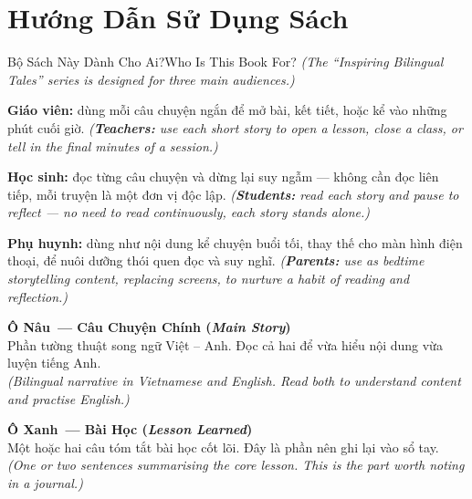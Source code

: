 \chapter*{Hướng Dẫn Sử Dụng Sách}

\begin{truyen}{Bộ Sách Này Dành Cho Ai?}{Who Is This Book For?}
\textit{(The ``Inspiring Bilingual Tales'' series is designed for three main audiences.)}

\textbf{Giáo viên:} dùng mỗi câu chuyện ngắn để mở bài, kết tiết, hoặc kể vào những phút cuối giờ.
\textit{(\textbf{Teachers:} use each short story to open a lesson, close a class, or tell in the final minutes of a session.)}

\textbf{Học sinh:} đọc từng câu chuyện và dừng lại suy ngẫm --- không cần đọc liên tiếp, mỗi truyện là một đơn vị độc lập.
\textit{(\textbf{Students:} read each story and pause to reflect --- no need to read continuously, each story stands alone.)}

\textbf{Phụ huynh:} dùng như nội dung kể chuyện buổi tối, thay thế cho màn hình điện thoại, để nuôi dưỡng thói quen đọc và suy nghĩ.
\textit{(\textbf{Parents:} use as bedtime storytelling content, replacing screens, to nurture a habit of reading and reflection.)}
\end{truyen}

\vspace{6pt}

\begin{tcolorbox}[
  colback=truyengold!8,
  colframe=truyengold!70!black,
  coltitle=black,
  fonttitle=\bfseries,
  title={Giải Thích Các Ô Màu Trong Sách \quad\textit{\small(Color-Box Guide)}},
  arc=4pt, boxrule=1pt, breakable, enhanced
]

\smallskip
\textbf{\color{truyenred}Ô Nâu~--- Câu Chuyện Chính (\textit{Main Story})}\\
Phần tường thuật song ngữ Việt -- Anh. Đọc cả hai để vừa hiểu nội dung vừa luyện tiếng Anh.\\
\textit{(Bilingual narrative in Vietnamese and English. Read both to understand content and practise English.)}

\medskip
\textbf{\color{truyenblue}Ô Xanh~--- Bài Học (\textit{Lesson Learned})}\\
Một hoặc hai câu tóm tắt bài học cốt lõi. Đây là phần nên ghi lại vào sổ tay.\\
\textit{(One or two sentences summarising the core lesson. This is the part worth noting in a journal.)}

\smallskip
\end{tcolorbox}

